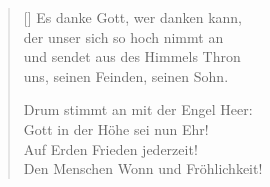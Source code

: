 \begin{multicols}{2}
\begin{verse}[\versewidth]
 Es danke Gott, wer danken kann,\\
der unser sich so hoch nimmt an\\
und sendet aus des Himmels Thron\\
uns, seinen Feinden, seinen Sohn.
 
 Drum stimmt an mit der Engel Heer:\\
Gott in der Höhe sei nun Ehr!\\
Auf Erden Frieden jederzeit!\\
Den Menschen Wonn und Fröhlichkeit!

\end{verse}
\end{multicols}
